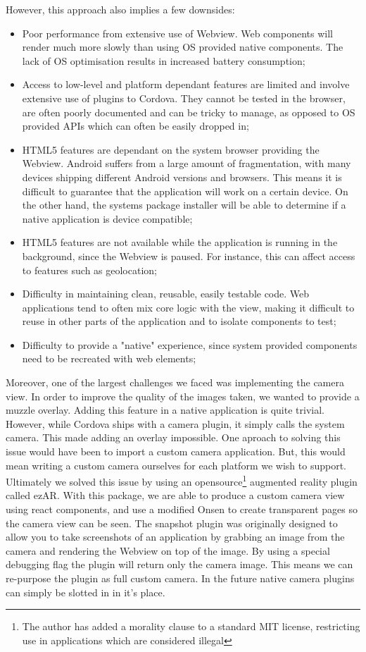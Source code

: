 However, this approach also implies a few downsides:

\begin{itemize}
	\item Poor performance from extensive use of Webview. Web components will render much more slowly than using OS provided native components. The lack of OS optimisation results in increased battery consumption;
	\item Access to low-level and platform dependant features are limited and involve extensive use of plugins to Cordova. They cannot be tested in the browser, are often poorly documented and can be tricky to manage, as opposed to OS provided APIs which can often be easily dropped in;
  \item HTML5 features are dependant on the system browser providing the Webview. Android suffers from a large amount of fragmentation, with many devices shipping different Android versions and browsers. This means it is difficult to guarantee that the application will work on a certain device. On the other hand, the systems package installer will be able to determine if a native application is device compatible;
  \item HTML5 features are not available while the application is running in the background, since the Webview is paused. For instance, this can affect access to features such as geolocation;
	\item Difficulty in maintaining clean, reusable, easily testable code. Web applications tend to often mix core logic with the view, making it difficult to reuse in other parts of the application and to isolate components to test;
	\item Difficulty to provide a "native" experience, since system provided components need to be recreated with web elements;
\end{itemize}

Moreover, one of the largest challenges we faced was implementing the camera view. In order to improve the quality of the images taken, we wanted to provide a muzzle overlay. Adding this feature in a native application is quite trivial. However, while Cordova ships with a camera plugin, it simply calls the system camera. This made adding an overlay impossible. One aproach to solving this issue would have been to import a custom camera application. But, this would mean writing a custom camera ourselves for each platform we wish to support.
Ultimately we solved this issue by using an opensource\footnote{The author has added a morality clause to a standard MIT license, restricting use in applications which are considered illegal} augmented reality plugin called ezAR. With this package, we are able to produce a custom camera view using react components, and use a modified Onsen to create transparent pages so the camera view can be seen. The snapshot plugin was originally designed to allow you to take screenshots of an application by grabbing an image from the camera and rendering the Webview on top of the image. By using a special debugging flag the plugin will return only the camera image. This means we can re-purpose the plugin as full custom camera. In the future native camera plugins can simply be slotted in in it's place.

